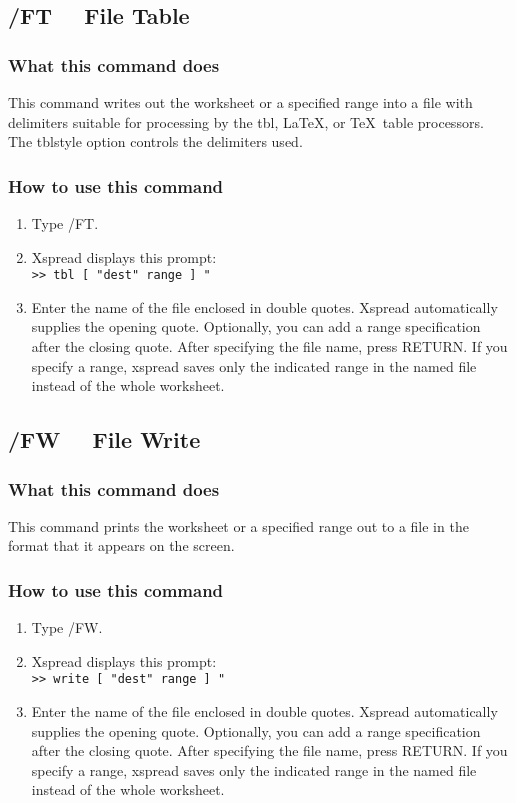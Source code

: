\subsection*{/FT \ \     File Table}

\subsubsection*{What this command does}
This command writes out the worksheet or a specified range into a file 
with delimiters suitable for processing by the tbl, \LaTeX, or
\TeX\  table processors.  The tblstyle option controls the delimiters used.

\subsubsection*{How to use this command}
\begin{enumerate}
\item{Type /FT.}
\item{Xspread displays this prompt:\\
        {\tt >> tbl [ "dest" range ] "} }
\item{Enter the name of the file enclosed in double quotes.  Xspread
        automatically supplies the opening quote.  Optionally, you can add
        a range specification after the closing quote.  After specifying
        the file name, press RETURN.  If you specify a range, xspread
        saves only the indicated range in the named file instead of the
        whole worksheet.}
\end{enumerate}
        
\subsection*{/FW \ \     File Write}

\subsubsection*{What this command does}
This command prints the worksheet or a specified range out to a file 
in the format that it appears on the screen.

\subsubsection*{How to use this command}
\begin{enumerate}
\item{Type /FW.}
\item{Xspread displays this prompt:\\
	{\tt >> write [ "dest" range ] "} }
\item{Enter the name of the file enclosed in double quotes.  Xspread
automatically supplies the opening quote.  Optionally, you can add 
a range specification after the closing quote.  After specifying 
the file name, press RETURN.  If you specify a range, xspread 
saves only the indicated range in the named file instead of the 
whole worksheet.}
\end{enumerate}



